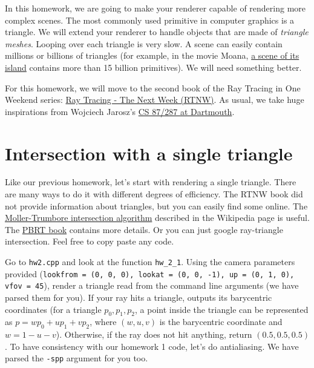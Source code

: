 




In this homework, we are going to make your renderer capable of rendering more complex scenes.
The most commonly used primitive in computer graphics is a triangle. We will extend your renderer to handle objects that are made of \emph{triangle meshes}. Looping over each triangle is very slow. A scene can easily contain millions or billions of triangles (for example, in the movie Moana, \href{https://www.disneyanimation.com/resources/moana-island-scene/}{a scene of its island} contains more than 15 billion primitives). We will need something better.

For this homework, we will move to the second book of the Ray Tracing in One Weekend series: \href{https://raytracing.github.io/books/RayTracingTheNextWeek.html}{Ray Tracing - The Next Week (RTNW)}. As usual, we take huge inspirations from Wojciech Jarosz's \href{https://cs87-dartmouth.github.io/Fall2022/assignments.html}{CS 87/287 at Dartmouth}.

\section{Intersection with a single triangle}
Like our previous homework, let's start with rendering a single triangle. There are many ways to do it with different degrees of efficiency. The RTNW book did not provide information about triangles, but you can easily find some online. The \href{https://en.wikipedia.org/wiki/M%C3%B6ller%E2%80%93Trumbore_intersection_algorithm}{Moller-Trumbore intersection algorithm} described in the Wikipedia page is useful. The \href{https://www.pbr-book.org/3ed-2018/Shapes/Triangle_Meshes#TriangleIntersection}{PBRT book} contains more details.
Or you can just google ray-triangle intersection.
Feel free to copy paste any code.

Go to \lstinline{hw2.cpp} and look at the function \lstinline{hw_2_1}. Using the camera parameters provided (\lstinline{lookfrom = (0, 0, 0), lookat = (0, 0, -1), up = (0, 1, 0), vfov = 45}), render a triangle read from the command line arguments (we have parsed them for you). If your ray hits a triangle, outputs its barycentric coordinates (for a triangle $p_0, p_1, p_2$, a point inside the triangle can be represented as $p = w p_0 + u p_1 + v p_2$, where $(w, u, v)$ is the barycentric coordinate and $w = 1 - u - v$). Otherwise, if the ray does not hit anything, return $(0.5, 0.5, 0.5)$. To have consistency with our homework 1 code, let's do antialiasing. We have parsed the \lstinline{-spp} argument for you too.

